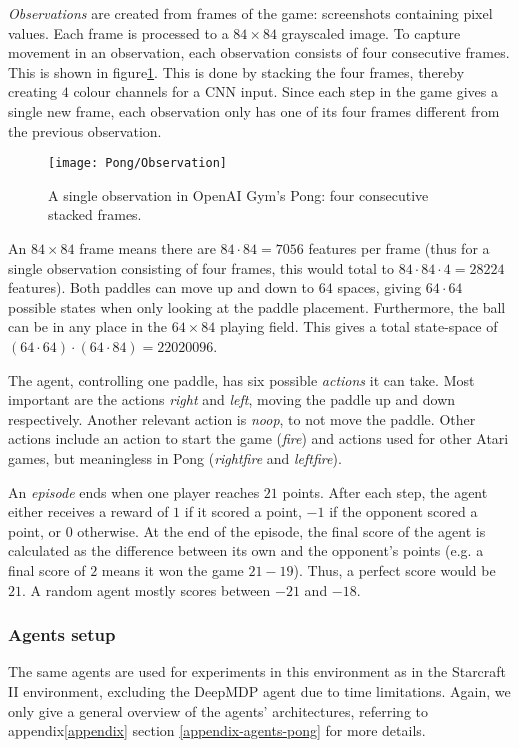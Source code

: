 \emph{Observations} are created from frames of the game: screenshots containing pixel values. Each frame is processed to a $84 \times 84$ grayscaled image. To capture movement in an observation, each observation consists of four consecutive frames. This is shown in figure\ref{fig:pong-obs}. This is done by stacking the four frames, thereby creating $4$ colour channels for a CNN input. Since each step in the game gives a single new frame, each observation only has one of its four frames different from the previous observation.

\begin{figure}[h]
    \centering
    \texttt{[image: Pong/Observation]}
    \caption{A single observation in OpenAI Gym's Pong: four consecutive stacked frames.}
    \label{fig:pong-obs}
\end{figure}

An $84 \times 84$ frame means there are $ 84 \cdot 84 = 7056$ features per frame (thus for a single observation consisting of four frames, this would total to $84 \cdot 84 \cdot 4 = 28224$ features). Both paddles can move up and down to $64$ spaces, giving $64 \cdot 64$ possible states when only looking at the paddle placement. Furthermore, the ball can be in any place in the $64 \times 84$ playing field. This gives a total state-space of $(64 \cdot 64) \cdot (64 \cdot 84) = 22020096$. 

The agent, controlling one paddle, has six possible \emph{actions} it can take. Most important are the actions \textit{right} and \textit{left}, moving the paddle up and down respectively. Another relevant action is \textit{noop}, to not move the paddle. Other actions include an action to start the game (\textit{fire}) and actions used for other Atari games, but meaningless in Pong (\textit{rightfire} and \textit{leftfire}). 

An \emph{episode} ends when one player reaches $21$ points. After each step, the agent either receives a reward of $1$ if it scored a point, $-1$ if the opponent scored a point, or $0$ otherwise. At the end of the episode, the final score of the agent is calculated as the difference between its own and the opponent's points (e.g. a final score of $2$ means it won the game $21 - 19$). Thus, a perfect score would be $21$. A random agent mostly scores between $-21$ and $-18$.

\subsubsection*{Agents setup}
The same agents are used for experiments in this environment as in the Starcraft II environment, excluding the DeepMDP agent due to time limitations. Again, we only give a general overview of the agents' architectures, referring to appendix\ref{appendix} section \ref{appendix-agents-pong} for more details.

